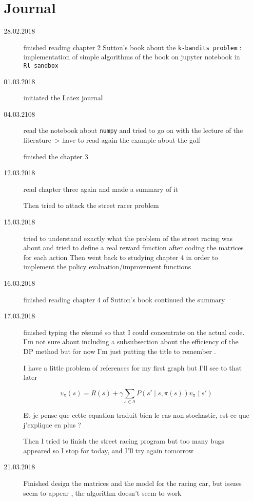 \documentclass[14pt,a4paper]{article}
\def\code#1{\texttt{#1}}
\theoremstyle{definition}
\begin{document}
\newpage

\section{Journal}
\begin{description}
\item[28.02.2018] finished reading chapter 2 Sutton's book about the \code{k-bandits problem} : implementation of simple algorithms of the book on jupyter notebook in \code{Rl-sandbox}
\item[01.03.2018] initiated the Latex journal 
\item[04.03.2108]read the notebook about \code{numpy} and tried to go on with the lecture of the literature--> have to read again the example about the golf 

finished the chapter 3 
\item[12.03.2018] read chapter three again and made a summary of it

Then tried to attack the street racer problem 

\item[15.03.2018] tried to understand exactly what the problem of the street racing was about and tried to define a real reward function after coding the matrices for each action
Then went back to studying chapter 4 in order to implement the policy evaluation/improvement functions 

\item[16.03.2018] finished reading chapter 4 of Sutton's book continued the summary
\item[17.03.2018] finished typing the r\'{e}sum\'{e} so that I could concentrate on the actual code. I'm not sure about including a subsubsection about the efficiency of the DP method but for now I'm just putting the title to remember .

I have a little problem of references for my first graph but I'll see to that later 

\begin{equation}
v_{\pi}(s)=R(s)+\gamma \sum_{s \in \mathcal{S}} P(s' \mid s,\pi(s))v_{\pi}(s')
\label{bellman1}
\end{equation}

Et je pense que cette equation traduit  bien le cas non stochastic, est-ce que j'explique en plus ?

Then I tried to finish the street racing program but too many bugs appeared so I stop for today, and I'll try again tomorrow

\item[21.03.2018] Finished design the matrices and the model for the racing car, but issues seem to appear , the algorithm doesn't seem to work


\end{description}
\end{document}
